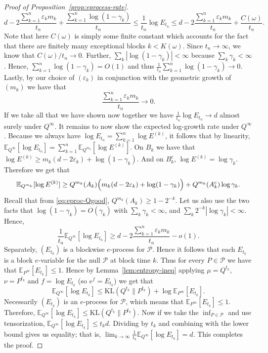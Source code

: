 \documentclass[10pt,a4paper]{amsart}
\newcommand{\E}{\mathbb{E}}
\newcommand{\KL}{\mathrm{KL}}
\newcommand{\Pcal}{\mathcal{P}}
\begin{document}
\begin{proof}[Proof of Proposition~\ref{prop:eprocess-rate}]
\[
d-2\frac{\sum_{k=1}^n \varepsilon_k m_k}{t_n} +\frac{\sum_{k=1}^n \log(1-\gamma_k)}{t_n} \le \frac{1}{t_n}\log E_{t_n} \le d-2\frac{\sum_{k=1}^n \varepsilon_k m_k}{t_n} +\frac{C(\omega)}{t_n}.
\]
Note that here $C(\omega)$ is simply some finite constant which accounts for the fact that there are finitely many exceptional blocks $k<K(\omega)$. Since $t_n\to\infty$, we know that $C(\omega)/t_n\to 0$. Further, $\sum_k |\log(1-\gamma_k)|<\infty$ because $\sum_k \gamma_k<\infty$. Hence, $\sum_{k=1}^n \log(1-\gamma_k)=O(1)$ and thus $\frac{1}{t_n}\sum_{k=1}^n \log(1-\gamma_k)\to 0$. Lastly, by our choice of $(\varepsilon_k)$ in conjunction with the geometric growth of $(m_k)$ we have that
\[
\frac{\sum_{k=1}^n \varepsilon_k m_k}{t_n}\longrightarrow 0.
\]
If we take all that we have shown now together we have $\frac{1}{t_n}\log E_{t_n}\to d$ almost surely under $Q^\infty$. It remains to now show the expected log-growth rate under $Q^\infty$. Because we always have $\log E_{t_n}=\sum_{k=1}^n \log E^{(k)}$, it follows that by linearity, $\E_{Q^\infty}[\log E_{t_n}]=\sum_{k=1}^n \E_{Q^{m_k}}[\log E^{(k)}]$. On $B_k$ we have that $\log E^{(k)}\ge m_k(d-2\varepsilon_k)+\log(1-\gamma_k)$. And on $B_k^c$, $\log E^{(k)}=\log\gamma_k$. Therefore we get that
\[
\E_{Q^{m_k}}[\log E^{(k)}] \ge Q^{m_k}(A_k)\Bigl(m_k(d-2\varepsilon_k)+\log(1-\gamma_k)\Bigr) +Q^{m_k}(A_k^c)\log\gamma_k.
\]
Recall that from \eqref{eq:eproc-Qgood}, $Q^{m_k}(A_k)\ge 1-2^{-k}$. Let us also use the two facts that $\log(1-\gamma_k)=O(\gamma_k)$ with $\sum_k\gamma_k<\infty$, and $\sum_k 2^{-k}|\log\gamma_k|<\infty$. Hence,
\[
\frac{1}{t_n}\E_{Q^\infty}[\log E_{t_n}] \ge d-2\frac{\sum_{k=1}^n \varepsilon_k m_k}{t_n} - o(1).
\]
Separately, $(E_{t_k})$ is a blockwise $e$-process for $\Pcal$. Hence it follows that each $E_{t_k}$ is a block $e$-variable for the null $\Pcal$ at block time $k$. Thus for every $P\in\Pcal$ we have that $\E_{P^\infty}[E_{t_k}]\le 1$. Hence by Lemma~\ref{lem:entropy-ineq} applying $\mu=Q^{t_k}$, $\nu=P^{t_k}$ and $f=\log E_{t_k}$ (so $e^f=E_{t_k}$) we get that
\[
\E_{Q^\infty}[\log E_{t_k}]\le \KL(Q^{t_k}\|P^{t_k})+\log \E_{P^\infty}[E_{t_k}].
\]
Necessarily $(E_{t_k})$ is an $e$-process for $\Pcal$, which means that $\E_{P^\infty}[E_{t_k}]\le 1$. Therefore, $\E_{Q^\infty}[\log E_{t_k}]\le \KL(Q^{t_k}\|P^{t_k})$. Now if we take the $\inf_{P\in\Pcal}$ and use tensorization, $\E_{Q^\infty}[\log E_{t_k}]\le t_k d$.
Dividing by $t_k$ and combining with the lower bound gives us equality; that is, $\lim_{k\to\infty}\frac{1}{t_k}\E_{Q^\infty}[\log E_{t_k}]=d$. This completes the proof.
\end{proof}
\end{document}

